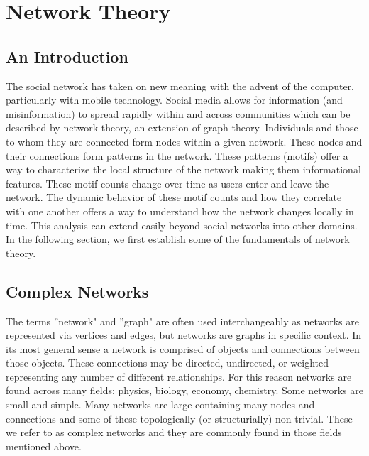 %

\chapter{Network Theory}

\section{An Introduction}
The social network has taken on new meaning with the advent of the computer, particularly with 
mobile technology. Social media allows for information (and misinformation) to spread rapidly
within and across communities which can be described by network theory, an extension of graph theory.
Individuals and those to whom they are connected form nodes within a given network. These nodes and their
connections form patterns in the network. These patterns (motifs) offer
a way to characterize the local structure of the network making them informational features. These motif counts change
over time as users enter and leave the network. The dynamic behavior of these motif counts and how they correlate with 
one another offers a way to understand how the network changes locally in time. This analysis can 
extend easily beyond social networks into other domains. In the following section, we first establish 
some of the fundamentals of network theory.


\section{Complex Networks}
The terms ''network" and ''graph" are often used interchangeably as networks are represented
via vertices and edges, but networks are graphs in specific context. In its 
most general sense a network is comprised of objects and connections between those objects. These
connections may be directed, undirected, or weighted representing any number of different relationships. 
For this reason networks are found across many fields: physics, biology, economy, chemistry.
Some networks are small and simple. Many networks are large containing many nodes and connections and some of these
topologically (or structurially) non-trivial. These we refer to as complex networks and they are 
commonly found in those fields mentioned above. 

